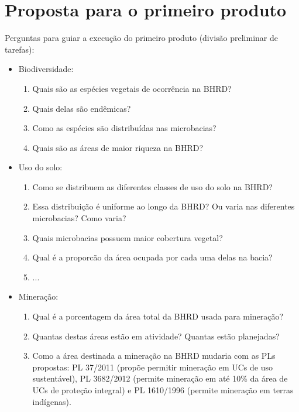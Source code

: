 \documentclass{article}
\begin{document}
\section{Proposta para o primeiro produto}

Perguntas para guiar a execução do primeiro produto (divisão preliminar de tarefas):

\begin{itemize}
    \item Biodiversidade:
    \begin{enumerate}
        \item Quais são as espécies vegetais de ocorrência na BHRD? 
        \item Quais delas são endêmicas?
        \item Como as espécies são distribuídas nas microbacias? 
        \item Quais são as áreas de maior riqueza na BHRD?
    \end{enumerate}
    
    \item Uso do solo:
    \begin{enumerate}
        \item Como se distribuem as diferentes classes de uso do solo na BHRD? 
        \item Essa distribuição é uniforme ao longo da BHRD? Ou varia nas diferentes microbacias? Como varia?
        \item Quais microbacias possuem maior cobertura vegetal?
        \item Qual é a proporcão da área ocupada por cada uma delas na bacia?
        \item ...
    \end{enumerate}
    
    \item Mineração:
    \begin{enumerate}
        \item Qual é a porcentagem da área total da BHRD usada para mineração?
        \item Quantas destas áreas estão em atividade? Quantas estão planejadas?
        \item Como a área destinada a mineração na BHRD mudaria com as PLs propostas: PL 37/2011 (propõe permitir mineração em UCs de uso sustentável), PL 3682/2012 (permite mineração em até 10\% da área de UCs de proteção integral) e PL 1610/1996 (permite mineração em terras indígenas).
    \end{enumerate}
    

\end{itemize}
\end{document}
